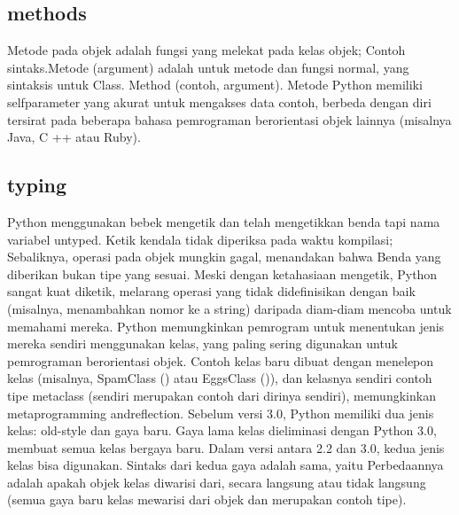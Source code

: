 \subsection {methods}
	Metode pada objek adalah fungsi yang melekat pada kelas objek; Contoh sintaks.Metode (argument) adalah untuk metode dan fungsi normal, 
	yang sintaksis untuk Class. Method (contoh, argument). Metode Python memiliki selfparameter yang akurat untuk mengakses data contoh, 
	berbeda dengan diri tersirat pada beberapa bahasa pemrograman berorientasi objek lainnya (misalnya Java, C ++ atau Ruby). 
	
\subsection {typing}
	Python menggunakan bebek mengetik dan telah mengetikkan benda tapi nama variabel untyped. Ketik kendala tidak diperiksa pada waktu kompilasi; Sebaliknya, operasi pada objek mungkin gagal, menandakan bahwa
	Benda yang diberikan bukan tipe yang sesuai. Meski dengan ketahasiaan mengetik, Python sangat kuat diketik, melarang operasi yang tidak didefinisikan dengan baik (misalnya, menambahkan nomor ke a
	string) daripada diam-diam mencoba untuk memahami mereka. Python memungkinkan pemrogram untuk menentukan jenis mereka sendiri menggunakan kelas, yang paling sering
	digunakan untuk pemrograman berorientasi objek. Contoh kelas baru dibuat dengan menelepon kelas (misalnya, SpamClass () atau EggsClass ()), dan kelasnya sendiri
	contoh tipe metaclass (sendiri merupakan contoh dari dirinya sendiri), memungkinkan metaprogramming andreflection. Sebelum versi 3.0, Python memiliki dua jenis kelas: old-style dan gaya baru. Gaya lama
	kelas dieliminasi dengan Python 3.0, membuat semua kelas bergaya baru. Dalam versi antara 2.2 dan 3.0, kedua jenis kelas bisa digunakan. Sintaks dari kedua gaya adalah sama, yaitu
	Perbedaannya adalah apakah objek kelas diwarisi dari, secara langsung atau tidak langsung (semua gaya baru kelas mewarisi dari objek dan merupakan contoh tipe).
      
